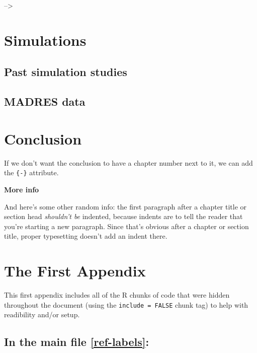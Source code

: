 \documentclass[12pt, twoside]{amherstthesis}
\begin{document}
--\textgreater{}

\hypertarget{sims}{%
\chapter{Simulations}\label{sims}}

\hypertarget{past-simulation-studies}{%
\section{Past simulation studies}\label{past-simulation-studies}}

\hypertarget{madres-data}{%
\section{MADRES data}\label{madres-data}}

\hypertarget{conclusion}{%
\chapter*{Conclusion}\label{conclusion}}

If we don't want the conclusion to have a chapter number next to it, we can add the \texttt{\{-\}} attribute.

\textbf{More info}

And here's some other random info: the first paragraph after a chapter title or section head \emph{shouldn't be} indented, because indents are to tell the reader that you're starting a new paragraph. Since that's obvious after a chapter or section title, proper typesetting doesn't add an indent there.

\appendix

\hypertarget{the-first-appendix}{%
\chapter{The First Appendix}\label{the-first-appendix}}

This first appendix includes all of the R chunks of code that were hidden throughout the document (using the \texttt{include\ =\ FALSE} chunk tag) to help with readibility and/or setup.

\hypertarget{in-the-main-file-refref-labels}{%
\section{In the main file \ref{ref-labels}:}\label{in-the-main-file-refref-labels}}
\end{document}
